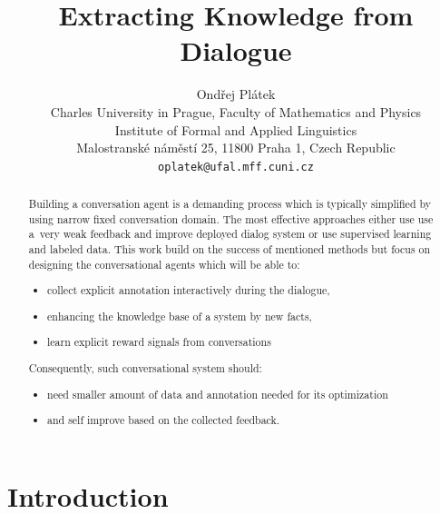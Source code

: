 \documentclass[11pt]{article}
\title{Extracting Knowledge from Dialogue}
\author{Ondřej Plátek \\
  Charles University in Prague, Faculty of Mathematics and Physics \\
  Institute of Formal and Applied Linguistics \\
  Malostranské náměstí 25, 11800 Praha 1, Czech Republic\\
  {\tt oplatek@ufal.mff.cuni.cz}\\}
\date{}
\begin{document}
\maketitle
\begin{abstract}
Building a conversation agent is a demanding process which is typically simplified by using narrow fixed conversation domain.
The most effective approaches either use use a~very weak feedback and improve deployed dialog system or use supervised learning and labeled data.
This work build on the success of mentioned methods but focus on designing the conversational agents which will be able to:
\begin{itemize}
    \item collect explicit annotation interactively during the dialogue,
    \item enhancing the knowledge base of a system by new facts,
    \item learn explicit reward signals from conversations
\end{itemize}
Consequently, such conversational system should:
\begin{itemize}
    \item need smaller amount of data and annotation needed for its optimization 
    \item and self improve based on the collected feedback.
\end{itemize}
\end{abstract}

\section{Introduction}
\label{sec:introduction}
\end{document}
